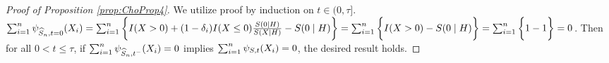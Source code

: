 %
%

%
{ %
\newcommand{\eesnht}{\estfunc_{\Snhat,t}}
\newcommand{\eesnhtm}{\estfunc_{\Snhat,t^-}}
\newcommand{\eesnhtzero}{\estfunc_{\Snhat,t=0}}
\newcommand{\argxi}{(X_i)}
\newcommand{\sumotn}{\sum_{i=1}^n}

\begin{proof}[Proof of Proposition \ref{prop:ChoProp4}]
We utilize proof by induction on $t \in (0, \tau]$.
$\sumotn \eesnhtzero \argxi  = \sumotn \bigg\{ I(X>0) + \omdi I(X \leq 0) \frac{\survfunc(0\mid\hist)}{\survfunc(X\mid\hist)}  - \survfunc(0\mid \hist) \bigg\} = \sumotn \bigg\{ I(X>0) - \survfunc(0\mid\hist)\bigg\} = \sumotn \bigg\{ 1-1\bigg\} = 0$.
Then for all $0 < t \leq \tau$, if $\sumotn \eesnhtm \argxi = 0$ implies $\sumotn \estfunclabel \argxi = 0$, the desired result holds.

\newcommand{\leftt}{t^-}
\newcommand{\hypoth}{\sumotn \eesnhtm = 0}
\newcommand{\xigt}{I(X_i > t)}
\newcommand{\xigtm}{I(X_i > \leftt)}
\newcommand{\xilet}{I(X_i \leq t)}
\newcommand{\xiletm}{I(X_i \leq \leftt)}

\newcommand{\argtmgH}{(\leftt\mid\hist)}
\newcommand{\argXigH}{(X_i\mid\hist)}
\newcommand{\efSnhat}{\frac{\Snhat\argtgH}{\Snhat\argXigH}}


\end{proof}}
